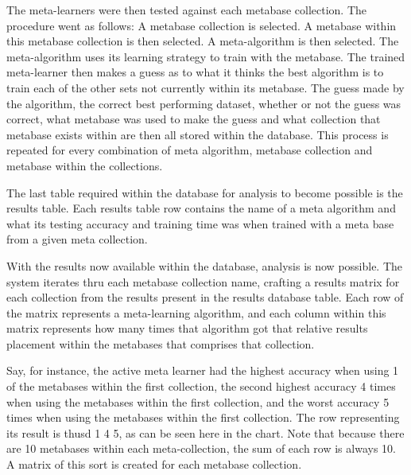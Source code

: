 \documentclass{article}
\begin{document}
The meta-learners were then tested against each metabase collection. The procedure
went as follows: A metabase collection is selected. A metabase within this
metabase collection is then selected. A meta-algorithm is then selected. The
meta-algorithm uses its learning strategy to train with the metabase. The
trained meta-learner then makes a guess as to what it thinks the best algorithm
is to train each of the other sets not currently within its metabase. The guess
made by the algorithm, the correct best performing dataset, whether or not the
guess was correct, what metabase was used to make the guess and what collection
that metabase exists within are then all stored within the database. This
process is repeated for every combination of meta algorithm, metabase collection
and metabase within the collections.

The last table required within the database for analysis to become possible
is the results table. Each results table row contains the name of a meta
algorithm and what its testing accuracy and training time was when trained
with a meta base from a given meta collection.

With the results now available within the database, analysis is now possible.
The system iterates thru each metabase collection name, crafting a results
matrix for each collection from the results present in the results
database table. Each row of the matrix represents a meta-learning
algorithm, and each column within this matrix represents how many times
that algorithm got that relative results placement within the metabases that
comprises that collection.


Say, for instance, the active meta learner had the highest accuracy when using 1
of the metabases within the first collection, the second highest accuracy 4
times when using the metabases within the first collection, and the worst
accuracy 5 times when using the metabases within the first collection.
The row representing its result is thusd  1 4 5, as can be seen
here in the chart. Note that because there are 10 metabases within each
meta-collection, the sum of each row is always 10. A matrix of this sort is
created for each metabase collection.
\end{document}
